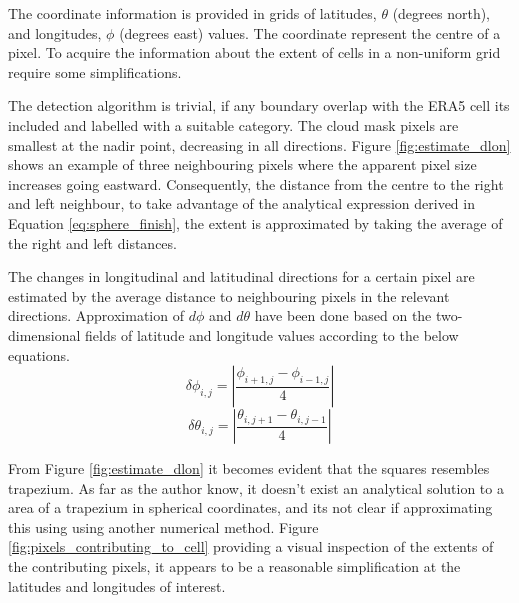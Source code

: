The coordinate information is provided in grids of latitudes, $\theta$ (degrees north), and longitudes, $\phi$ (degrees east) values. The coordinate represent the centre of a pixel. To acquire the information about the extent of cells in a non-uniform grid require some simplifications. 

The detection algorithm is trivial, if any boundary overlap with the ERA5 cell its included and labelled with a suitable category.
The cloud mask pixels are smallest at the nadir point, decreasing in all directions.
Figure \ref{fig:estimate_dlon} shows an example of three neighbouring pixels where the apparent pixel size increases going eastward. Consequently, the distance from the centre to the right and left neighbour, to take advantage of the analytical expression derived in Equation \eqref{eq:sphere_finish}, the extent is approximated by taking the average of the right and left distances. 


The changes in longitudinal and latitudinal directions for a certain pixel are estimated by the average distance to neighbouring pixels in the relevant directions. Approximation of $d\phi$ and $d\theta$ have been done based on the two-dimensional fields of latitude and longitude values according to the below equations.%
\begin{equation} \label{eq:app_lon}
    \delta \phi_{i,j} = \left| \frac{\phi_{i+1,j} - \phi_{i-1, j}}{4} \right|
\end{equation}
\begin{equation} \label{eq:app_lat}
    \delta \theta_{i,j} = \left| \frac{\theta_{i,j+1} - \theta_{i, j-1}}{4} \right|
\end{equation}

From Figure \ref{fig:estimate_dlon} it becomes 
evident that the squares resembles trapezium. As far as the author know, it doesn't exist an analytical solution to a area of a trapezium in spherical coordinates, and its not clear if approximating this using using another numerical method. Figure \ref{fig:pixels_contributing_to_cell} providing a visual inspection of the extents of the contributing pixels, it appears to be a reasonable simplification at the latitudes and longitudes of interest. 

